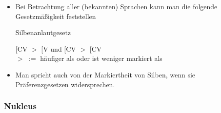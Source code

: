 \begin{frame}

\begin{itemize}
	\item Bei Betrachtung aller (bekannten) Sprachen kann man die folgende Gesetzmäßigkeit feststellen \citep[cf.][212f.]{Hall00a}
	
	\begin{block}{Silbenanlautgesetz}
	
	\sub{$\sigma$}[CV $>$ \sub{$\sigma$}[V 
	und
	\sub{$\sigma$}[CV $>$ \sub{$\sigma$}[CV \\
	$>$ $:=$ häufiger als oder ist weniger markiert als 



	
	\end{block}
	 
	 \item Man spricht auch von der Markiertheit von Silben, wenn sie Präferenzgesetzen widersprechen.

\end{itemize}

\end{frame}



\subsubsection{Nukleus}

